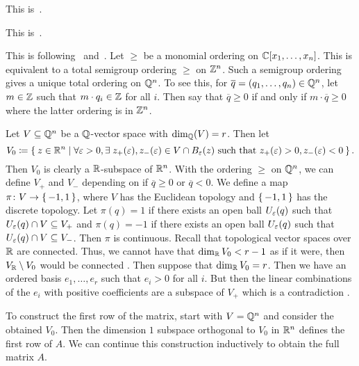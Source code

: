 \documentclass[letterpaper, 11pt, oneside]{book}
\begin{document}
\begin{sol}
  This is~\cite[Chapter 2, \S 7, Theorem 5]{book:IVA}.
\end{sol}

\begin{sol}
  This is~\cite[Chapter 3, \S 1, Theorem 2]{book:IVA}.
\end{sol}

\clearpage

\begin{sol}
  This is following~\cite{Robbiano_term_orders} and~\cite{book:Singular_Introduction}.
  Let $\geq$ be a monomial ordering on $\mathbb{C}[x_{1}, \ldots, x_{n}]$.
  This is equivalent to a total semigroup ordering $\geq$ on $\mathbb{Z}^{n}$.
  Such a semigroup ordering gives a unique total ordering on $\mathbb{Q}^{n}$.
  To see this, for $\overline{q} = (q_{1}, \ldots, q_{n}) \in \mathbb{Q}^{n}$, let $m \in \mathbb{Z}$ such that $m \cdot q_{i} \in \mathbb{Z}$ for all $i$.
  Then say that $\overline{q} \geq 0$ if and only if $m \cdot \overline{q} \geq 0$ where the latter ordering is in $\mathbb{Z}^{n}$.

  Let $V \subseteq \mathbb{Q}^{n}$ be a $\mathbb{Q}$-vector space with $\dim_{\mathbb{Q}}(V) = r$.
  Then let
  \[
    V_{0} \coloneqq \Set{z \in \mathbb{R}^{n} | \forall \varepsilon> 0, \exists\; z_{+}(\varepsilon), z_{-}(\varepsilon) \in V \cap B_{\varepsilon}(z) \text{ such that } z_{+}(\varepsilon) > 0, z_{-}(\varepsilon) < 0}.
  \]
  Then $V_{0}$ is clearly a $\mathbb{R}$-subspace of $\mathbb{R}^{n}$.
  With the ordering $\geq$ on $\mathbb{Q}^{n}$, we can define $V_{+}$ and $V_{-}$ depending on if $\overline{q} \geq 0$ or $\overline{q} < 0$.
  We define a map $\pi\colon V \to \set{-1, 1}$, where $V$ has the Euclidean topology and $\set{-1, 1}$ has the discrete topology.
  Let $\pi(q) = 1$ if there exists an open ball $U_{\varepsilon}(q)$ such that $U_{\varepsilon}(q) \cap V \subseteq V_{+}$ and $\pi(q) = -1$ if there exists an open ball $U_{\varepsilon}(q)$ such that $U_{\varepsilon}(q) \cap V \subseteq V_{-}$.
  Then $\pi$ is continuous.
  Recall that topological vector spaces over $\mathbb{R}$ are connected.
  Thus, we cannot have that $\dim_{\mathbb{R}} V_{0} < r - 1$ as if it were, then $V_{\mathbb{R}} \setminus V_{0}$ would be connected .
  Then suppose that $\dim_{\mathbb{R}} V_{0} = r$.
  Then we have an ordered basis $e_{1}, \ldots, e_{r}$ such that $e_{i} > 0$ for all $i$.
  But then the linear combinations of the $e_{i}$ with positive coefficients are a subspace of $V_{+}$ which is a contradiction .

  To construct the first row of the matrix, start with $V = \mathbb{Q}^{n}$ and consider the obtained $V_{0}$.
  Then the dimension $1$ subspace orthogonal to $V_{0}$ in $\mathbb{R}^{n}$ defines the first row of $A$.
  We can continue this construction inductively to obtain the full matrix $A$.
\end{sol}
\end{document}
